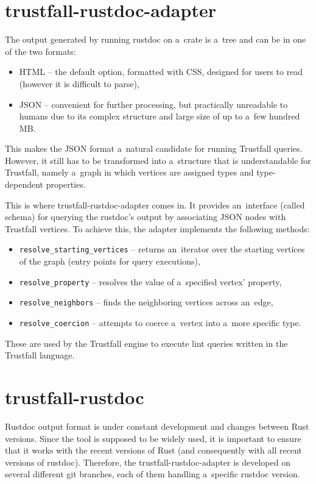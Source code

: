 \documentclass[licencjacka,en]{pracamgr}
\begin{document}
\section{trustfall-rustdoc-adapter}\label{r:section_trustfall_rustdoc_adapter}
The output generated by running rustdoc on a~crate is a~tree and can be in one of the two formats:
\begin{itemize}
	\item HTML -- the default option, formatted with CSS, designed for users to read (however it is
		difficult to parse),
	\item JSON -- convenient for further processing, but practically unreadable to humans due to
		its complex structure and large size of up to a~few hundred MB.
\end{itemize}
This makes the JSON format a~natural candidate for running Trustfall queries. However, it still has
to be transformed into a~structure that is understandable for Trustfall, namely a~graph in which
vertices are assigned types and type-dependent properties.

This is where trustfall-rustdoc-adapter comes in. It provides an~interface (called schema)
for querying the rustdoc's output by associating JSON nodes with Trustfall vertices.
To achieve this, the adapter implements the following methods:
\begin{itemize}
	\item \texttt{resolve\_starting\_vertices} -- returns an~iterator over the starting vertices of
		the graph (entry points for query executions),
	\item \texttt{resolve\_property} -- resolves the value of a~specified vertex' property,
	\item \texttt{resolve\_neighbors} -- finds the neighboring vertices across an~edge,
	\item \texttt{resolve\_coercion} -- attempts to coerce a~vertex into a~more specific type.
\end{itemize}
These are used by the Trustfall engine to execute lint queries written in the Trustfall language.

\section{trustfall-rustdoc}\label{r:section_trustfall_rustdoc}

Rustdoc output format is under constant development and changes between Rust versions.
Since the tool is supposed to be widely used, it is important to ensure that it works with
the recent versions of Rust (and consequently with all recent versions of rustdoc).
Therefore, the trustfall-rustdoc-adapter is developed on several different git branches,
each of them handling a~specific rustdoc version.
\end{document}
